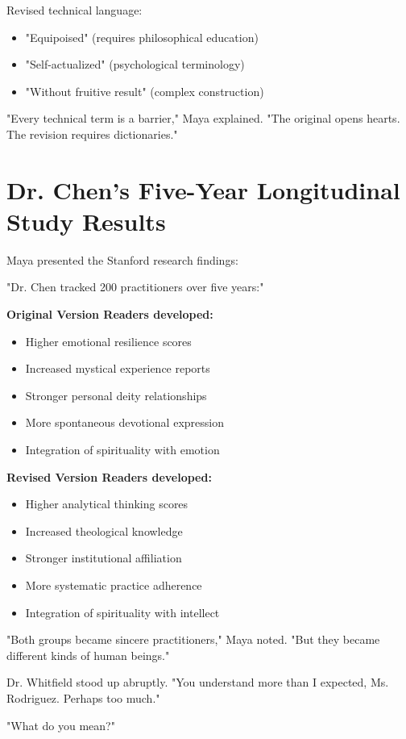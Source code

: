\documentclass[11pt,twoside]{book}
\begin{document}
Revised technical language:
\begin{itemize}
\item "Equipoised" (requires philosophical education)
\item "Self-actualized" (psychological terminology)
\item "Without fruitive result" (complex construction)
\end{itemize}

"Every technical term is a barrier," Maya explained. "The original opens hearts. The revision requires dictionaries."
\section*{Dr. Chen's Five-Year Longitudinal Study Results}
\label{sec:orgd0eadee}

Maya presented the Stanford research findings:

"Dr. Chen tracked 200 practitioners over five years:"

\textbf{\textbf{Original Version Readers developed:}}
\begin{itemize}
\item Higher emotional resilience scores
\item Increased mystical experience reports
\item Stronger personal deity relationships
\item More spontaneous devotional expression
\item Integration of spirituality with emotion
\end{itemize}

\textbf{\textbf{Revised Version Readers developed:}}
\begin{itemize}
\item Higher analytical thinking scores
\item Increased theological knowledge
\item Stronger institutional affiliation
\item More systematic practice adherence
\item Integration of spirituality with intellect
\end{itemize}

"Both groups became sincere practitioners," Maya noted. "But they became different kinds of human beings."

Dr. Whitfield stood up abruptly. "You understand more than I expected, Ms. Rodriguez. Perhaps too much."

"What do you mean?"
\end{document}
